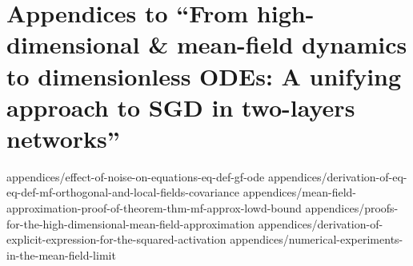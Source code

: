 \chapter[A unifying approach to SGD in two-layers networks]{Appendices to ``From high-dimensional \& mean-field dynamics to dimensionless ODEs: A unifying approach to SGD in two-layers networks''}
\label{chap:appendix-2302}

{appendices/effect-of-noise-on-equations-eq-def-gf-ode}
{appendices/derivation-of-eq-eq-def-mf-orthogonal-and-local-fields-covariance}
{appendices/mean-field-approximation-proof-of-theorem-thm-mf-approx-lowd-bound}
{appendices/proofs-for-the-high-dimensional-mean-field-approximation}
{appendices/derivation-of-explicit-expression-for-the-squared-activation}
{appendices/numerical-experiments-in-the-mean-field-limit}
